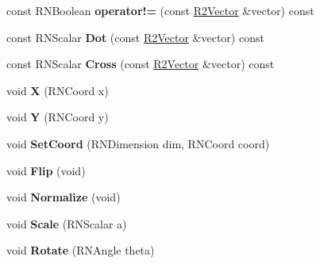 \begin{DoxyCompactItemize}
\item 
const R\+N\+Boolean {\bfseries operator!=} (const \hyperlink{class_r2_vector}{R2\+Vector} \&vector) const \hypertarget{class_r2_vector_a205c168855985bed9a3043125182bc55}{}\label{class_r2_vector_a205c168855985bed9a3043125182bc55}

\item 
const R\+N\+Scalar {\bfseries Dot} (const \hyperlink{class_r2_vector}{R2\+Vector} \&vector) const \hypertarget{class_r2_vector_ae0653778982303095e3fd26f05edf13f}{}\label{class_r2_vector_ae0653778982303095e3fd26f05edf13f}

\item 
const R\+N\+Scalar {\bfseries Cross} (const \hyperlink{class_r2_vector}{R2\+Vector} \&vector) const \hypertarget{class_r2_vector_a6f08d12daea47fd773e2e1bbc46337a0}{}\label{class_r2_vector_a6f08d12daea47fd773e2e1bbc46337a0}

\item 
void {\bfseries X} (R\+N\+Coord x)\hypertarget{class_r2_vector_a87394d2eeb7cf20a8b68e4e1ca723c29}{}\label{class_r2_vector_a87394d2eeb7cf20a8b68e4e1ca723c29}

\item 
void {\bfseries Y} (R\+N\+Coord y)\hypertarget{class_r2_vector_a575b034f3830d6c00671a1e671ccced0}{}\label{class_r2_vector_a575b034f3830d6c00671a1e671ccced0}

\item 
void {\bfseries Set\+Coord} (R\+N\+Dimension dim, R\+N\+Coord coord)\hypertarget{class_r2_vector_a15e90da3fede4e9c6b57df03898f5c54}{}\label{class_r2_vector_a15e90da3fede4e9c6b57df03898f5c54}

\item 
void {\bfseries Flip} (void)\hypertarget{class_r2_vector_a15eda2f45f9511c514758cb7cade1d76}{}\label{class_r2_vector_a15eda2f45f9511c514758cb7cade1d76}

\item 
void {\bfseries Normalize} (void)\hypertarget{class_r2_vector_a05815045f5d8827acc70a6098aa10930}{}\label{class_r2_vector_a05815045f5d8827acc70a6098aa10930}

\item 
void {\bfseries Scale} (R\+N\+Scalar a)\hypertarget{class_r2_vector_a6edda42f20bfd5006c0ceee9923c6482}{}\label{class_r2_vector_a6edda42f20bfd5006c0ceee9923c6482}

\item 
void {\bfseries Rotate} (R\+N\+Angle theta)\hypertarget{class_r2_vector_a9f5c0f90ac7c631213305bf9a3056f6a}{}\label{class_r2_vector_a9f5c0f90ac7c631213305bf9a3056f6a}


\end{DoxyCompactItemize}
